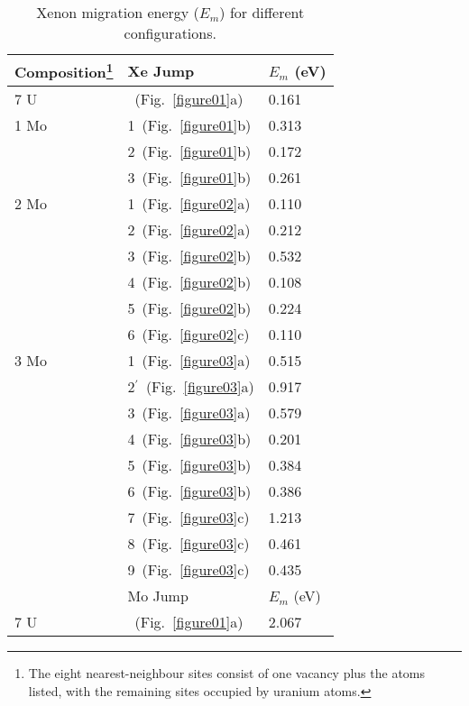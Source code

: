 \begin{table}
    \caption{Xenon migration energy ($E_m$) for different configurations.}
    \label{tab_acten}
    \centering
    \begin{minipage}{19.45em}
    \begin{tabular}{ l l l }
      \toprule
        Composition\footnote{The eight nearest-neighbour sites consist of
            one vacancy plus the atoms listed, with the remaining sites
            occupied by uranium atoms.}
        & Xe Jump
        & $E_m$ (eV) \\
      \midrule
        7 U & ~(Fig.~\ref{figure01}a) & 0.161  \\
        1 Mo & 1~(Fig.~\ref{figure01}b) & 0.313 \\ 
             & 2~(Fig.~\ref{figure01}b) & 0.172 \\
             & 3~(Fig.~\ref{figure01}b) & 0.261 \\
        2 Mo & 1~(Fig.~\ref{figure02}a) & 0.110 \\
             & 2~(Fig.~\ref{figure02}a) & 0.212 \\
             & 3~(Fig.~\ref{figure02}b) & 0.532 \\
             & 4~(Fig.~\ref{figure02}b) & 0.108 \\
             & 5~(Fig.~\ref{figure02}b) & 0.224 \\
             & 6~(Fig.~\ref{figure02}c) & 0.110 \\
 	3 Mo & 1~(Fig.~\ref{figure03}a) & 0.515 \\
	     & 2$^\prime$~(Fig.~\ref{figure03}a) & 0.917	\\
	     & 3~(Fig.~\ref{figure03}a) & 0.579	\\
	     & 4~(Fig.~\ref{figure03}b) & 0.201	\\
	     & 5~(Fig.~\ref{figure03}b) & 0.384	\\
	     & 6~(Fig.~\ref{figure03}b) & 0.386	\\
	     & 7~(Fig.~\ref{figure03}c) & 1.213	\\
	     & 8~(Fig.~\ref{figure03}c) & 0.461 \\
	     & 9~(Fig.~\ref{figure03}c) & 0.435 \\
      \midrule
             & Mo Jump & $E_m$ (eV) \\%
      \midrule
        7 U & ~(Fig.~\ref{figure01}a)  & 2.067 \\
      \bottomrule
    \end{tabular}
    \end{minipage}
\end{table}



